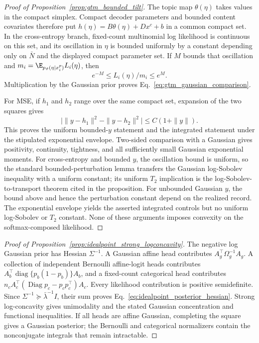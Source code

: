 \begin{proof}[Proof of Proposition~\ref{prop:gtm_bounded_tilt}]
The topic map $\theta(\eta)$ takes values in the compact simplex.  Compact
decoder parameters and bounded content covariates therefore put
$h(\eta)=B\theta(\eta)+Dx^c+b$ in a common compact set.  In the
cross-entropy branch, fixed-count multinomial log likelihood is continuous on
this set, and its oscillation in $\eta$ is bounded uniformly by a constant
depending only on $\bar N$ and the displayed compact parameter set.  If
$M$ bounds that oscillation and
$m_i=\E_{p_\vartheta(\eta\mid x_i^p)}L_i(\eta)$, then
\[
 e^{-M}\leq L_i(\eta)/m_i\leq e^M.
\]
Multiplication by the Gaussian prior proves
Eq.~\eqref{eq:gtm_gaussian_comparison}.

For MSE, if $h_1$ and $h_2$ range over the same compact set, expansion of the
two squares gives
\[
 \big|\|y-h_1\|^2-\|y-h_2\|^2\big|
 \leq C(1+\|y\|).
\]
This proves the uniform bounded-$y$ statement and the integrated statement
under the stipulated exponential envelope.  Two-sided comparison with a
Gaussian gives positivity, continuity, tightness, and all sufficiently small
Gaussian exponential moments.  For cross-entropy and bounded $y$, the
oscillation bound is uniform, so the standard bounded-perturbation lemma
transfers the Gaussian log-Sobolev inequality with a uniform constant; its
uniform $T_2$ implication is the log-Sobolev-to-transport theorem cited in the
proposition.  For unbounded Gaussian $y$, the bound above and hence the
perturbation constant depend on the realized record.  The exponential
envelope yields the asserted integrated controls but no uniform log-Sobolev or
$T_2$ constant.  None of these arguments imposes convexity on the
softmax-composed likelihood.
\end{proof}

\begin{proof}[Proof of Proposition~\ref{prop:idealpoint_strong_logconcavity}]
The negative log Gaussian prior has Hessian $\Sigma^{-1}$.  A Gaussian affine
head contributes $A_g^\top\Omega_g^{-1}A_g$.  A collection of independent
Bernoulli affine-logit heads contributes
$A_b^\top\operatorname{diag}\{p_b(1-p_b)\}A_b$, and a fixed-count
categorical head contributes
$n_cA_c^\top(\operatorname{Diag}p_c-p_cp_c^\top)A_c$.  Every likelihood
contribution is positive semidefinite.  Since
$\Sigma^{-1}\succeq\bar\lambda^{-1}I$, their sum proves
Eq.~\eqref{eq:idealpoint_posterior_hessian}.  Strong log-concavity gives
unimodality and the stated Gaussian concentration and functional
inequalities.  If all heads are affine Gaussian, completing the square gives
a Gaussian posterior; the Bernoulli and categorical normalizers contain the
nonconjugate integrals that remain intractable.
\end{proof}

